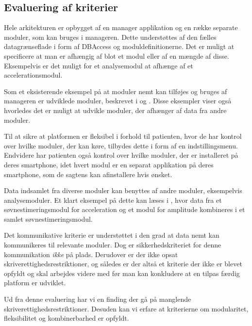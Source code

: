 \subsection{Evaluering af kriterier}
\begin{description}[style=nextline]
	\item[Modulær]
	Hele arkitekturen er opbygget af en manager applikation og en række separate moduler, som kan bruges i manageren.
	Dette understøttes af den fælles datagrænseflade i form af DBAccess og moduldefinitionerne.  
	Det er muligt at specificere at man er afhængig af blot et modul eller af en mængde af disse.
	Eksempelvis er det muligt for et analysemodul at afhænge af et accelerationsmodul.
	
	Som et eksisterende eksempel på at moduler nemt kan tilføjes og bruges af manageren er udviklede moduler, beskrevet i \citet{misc:soevnrapp} og \citet{misc:surveyrapp}.
	Disse eksempler viser også hvorledes det er muligt at udvikle moduler, der afhænger af data fra andre moduler.
	
	\item[Fleksibilitet]
	Til at sikre at platformen er fleksibel i forhold til patienten, hvor de har kontrol over hvilke moduler, der kan køre, tilbydes dette i form af en indstillingsmenu.
	Endvidere har patienten også kontrol over hvilke moduler, der er installeret på deres smartphone, idet hvert modul er en separat applikation på deres smartphone, som de sagtens kan afinstallere hvis ønsket.
	
	\item[Kombinerbar]
	Data indsamlet fra diverse moduler kan benyttes af andre moduler, eksempelvis analysemoduler.
	Et klart eksempel på dette kan læses i \citet{misc:soevnrapp}, hvor data fra et søvnestimeringsmodul for acceleration og et modul for amplitude kombineres i et samlet søvnestimeringsmodul.
	
	\item[Kommunikativ]
	Det kommunikative kriterie er understøttet i den grad at data nemt kan kommunikeres til relevante moduler.
	Dog er sikkerhedskriteriet for denne kommunikation \textit{ikke} på plads.
	Derudover er der ikke opsat skriverettighedsrestriktioner, og således er der altså et kriterie der ikke er blevet opfyldt og skal arbejdes videre med før man kan konkludere at en tilpas færdig platform er udviklet.
\end{description}

Ud fra denne evaluering har vi en finding der gå på manglende skriverettighedsrestriktioner.
Desuden kan vi erfare at kriterierne om modularitet, fleksibilitet og kombinerbarhed er opfyldt.
